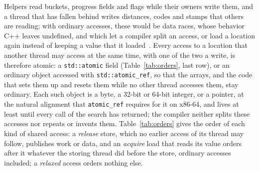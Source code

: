 Helpers read buckets, progress fields and flags while their owners write them, and a thread that has fallen behind writes distances, codes and stamps that others are reading; with ordinary accesses, these would be data races, whose behavior C++ leaves undefined, and which let a compiler split an access, or load a location again instead of keeping a value that it loaded~\cite{boehm_cpp, boehm_benign}. Every access to a location that another thread may access at the same time, with one of the two a write, is therefore atomic: a \texttt{std::atomic} field (Table~\ref{tab:orders}, last row), or an ordinary object accessed with \texttt{std::atomic\_ref}, so that the arrays, and the code that sets them up and resets them while no other thread accesses them, stay ordinary. Each such object is a byte, a 32-bit or 64-bit integer, or a pointer, at the natural alignment that \texttt{atomic\_ref} requires for it on x86-64, and lives at least until every call of the search has returned; the compiler neither splits these accesses nor repeats or invents them. Table~\ref{tab:orders} gives the order of each kind of shared access: a \emph{release} store, which no earlier access of its thread may follow, publishes work or data, and an \emph{acquire} load that reads its value orders after it whatever the storing thread did before the store, ordinary accesses included; a \emph{relaxed} access orders nothing else.

